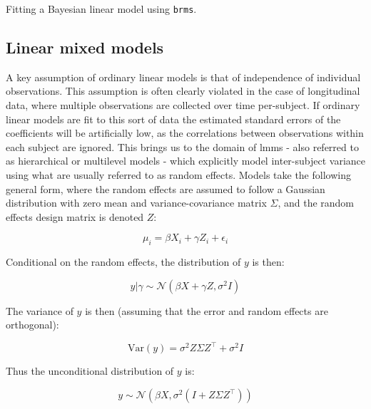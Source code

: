 \documentclass{report}
\begin{document}
\begin{listing}[h!]
\inputminted{r}{Example-Code/brms_linear_model.R}
\caption{Fitting a Bayesian linear model using \texttt{brms}.}
\label{listing:brms-example}
\end{listing}

\subsection{Linear mixed models}

A key assumption of ordinary linear models is that of independence of individual observations. This assumption is often clearly violated in the case of longitudinal data, where multiple observations are collected over time per-subject. If ordinary linear models are fit to this sort of data the estimated standard errors of the coefficients will be artificially low, as the correlations between observations within each subject are ignored. This brings us to the domain of \glspl{lmm} - also referred to as hierarchical or multilevel models - which explicitly model inter-subject variance using what are usually referred to as random effects. Models take the following general form, where the random effects are assumed to follow a Gaussian distribution with zero mean and variance-covariance matrix $\Sigma$, and the random effects design matrix is denoted $Z$:

\begin{equation}\label{eq:ols-mixed-model-form}
    \mu_i = \beta X_i + \gamma Z_i + \epsilon_i
\end{equation}

Conditional on the random effects, the distribution of $y$ is then:

\begin{equation}\label{eq:ols-mixed-model-y-dist-conditional}
    y|\gamma \sim \mathcal{N}\left(\beta X + \gamma Z, \sigma^2 I\right)
\end{equation}

The variance of $y$ is then (assuming that the error and random effects are orthogonal):

\begin{equation}\label{eq:ols-mixed-model-y-variance}
    \text{Var}(y) = \sigma^2 Z\Sigma Z^\intercal + \sigma^2 I
\end{equation}

Thus the unconditional distribution of $y$ is:

\begin{equation}\label{eq:ols-mixed-model-y-dist-unconditional}
    y \sim \mathcal{N}\left(\beta X, \sigma^2\left(I + Z \Sigma Z^\intercal\right)\right)
\end{equation}
\end{document}
